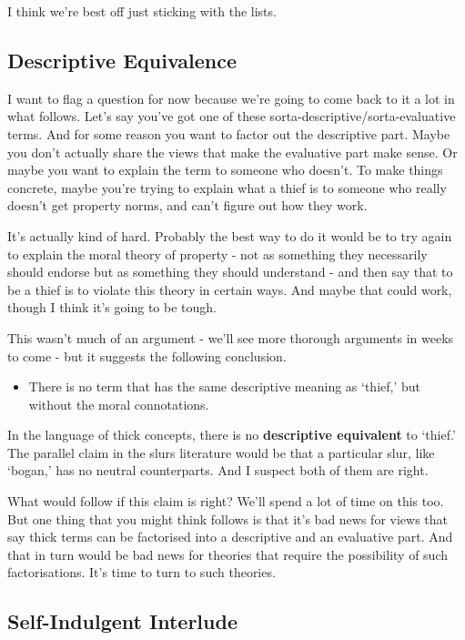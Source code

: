 \documentclass[
]{article}
\providecommand{\tightlist}{%
  \setlength{\itemsep}{0pt}\setlength{\parskip}{0pt}}
\begin{document}
I think we're best off just sticking with the lists.

\hypertarget{descriptive-equivalence}{%
\subsection{Descriptive Equivalence}\label{descriptive-equivalence}}

I want to flag a question for now because we're going to come back to it
a lot in what follows. Let's say you've got one of these
sorta-descriptive/sorta-evaluative terms. And for some reason you want
to factor out the descriptive part. Maybe you don't actually share the
views that make the evaluative part make sense. Or maybe you want to
explain the term to someone who doesn't. To make things concrete, maybe
you're trying to explain what a thief is to someone who really doesn't
get property norms, and can't figure out how they work.

It's actually kind of hard. Probably the best way to do it would be to
try again to explain the moral theory of property - not as something
they necessarily should endorse but as something they should understand
- and then say that to be a thief is to violate this theory in certain
ways. And maybe that could work, though I think it's going to be tough.

This wasn't much of an argument - we'll see more thorough arguments in
weeks to come - but it suggests the following conclusion.

\begin{itemize}
\tightlist
\item
  There is no term that has the same descriptive meaning as `thief,' but
  without the moral connotations.
\end{itemize}

In the language of thick concepts, there is no \textbf{descriptive
equivalent} to `thief.' The parallel claim in the slurs literature would
be that a particular slur, like `bogan,' has no neutral counterparts.
And I suspect both of them are right.

What would follow if this claim is right? We'll spend a lot of time on
this too. But one thing that you might think follows is that it's bad
news for views that say thick terms can be factorised into a descriptive
and an evaluative part. And that in turn would be bad news for theories
that require the possibility of such factorisations. It's time to turn
to such theories.

\hypertarget{self-indulgent-interlude}{%
\subsection{Self-Indulgent Interlude}\label{self-indulgent-interlude}}
\end{document}
